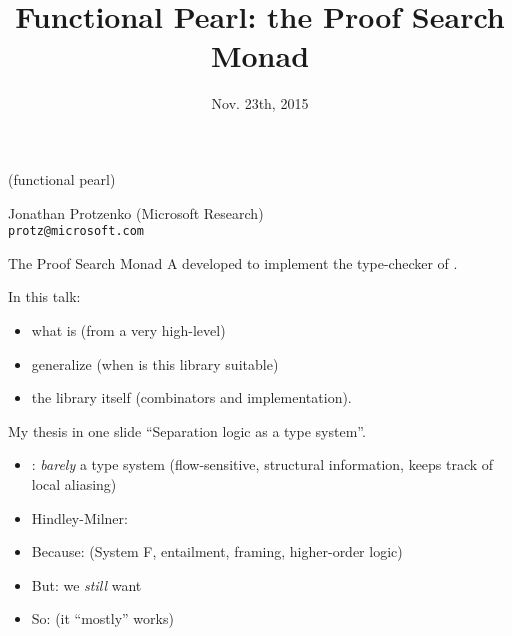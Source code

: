 \documentclass[final,xetex]{beamer}
\title[The Proof Search Monad]{
  Functional Pearl: the Proof Search Monad
}
\author[J. Protzenko]{
  \newauthor{Jonathan Protzenko}{protz@microsoft.com}
}
\institute{Microsoft Research}
\date{Nov. 23th, 2015}
\begin{document}
\begin{frame}
  \begin{center}
    {\raggedright\large (functional pearl)\\
    \Huge\vspace{.2em}
    \hspace{1.2em}}
  \end{center}

  \vspace{3cm}

    Jonathan Protzenko (Microsoft Research)\\
    \scriptsize
    \texttt{protz@microsoft.com}
\end{frame}

\begin{frame}{The Proof Search Monad}
  A  developed to implement the type-checker of \mezzo.

  \bigskip

  In this talk:
  \begin{itemize}
    \item what is \mezzo (from a very high-level)
    \item generalize (when is this library suitable)
    \item the library itself (combinators and implementation).
  \end{itemize}
\end{frame}

\begin{frame}[plain]
  \backupslide
\end{frame}

\begin{frame}{My thesis in one slide}
  ``Separation logic as a type system''. %

  \begin{itemize}
    \item \green{\mezzo}: \emph{barely} a type system
      {\tiny(flow-sensitive, structural information, keeps track of local
      aliasing)}
    \item Hindley-Milner: 
    \item Because:  {\tiny(System F, entailment, framing,
      higher-order logic)}
    \item But: we \emph{still} want 
    \item So: \emph{} (it ``mostly'' works)
  \end{itemize}
\end{frame}
\end{document}
